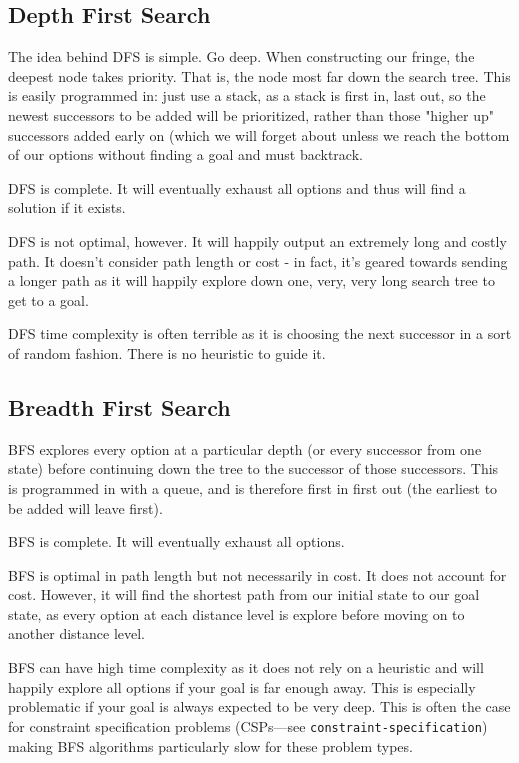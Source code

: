\documentclass[12pt]{article}
\begin{document}
\subsection*{Depth First Search}

The idea behind DFS is simple. Go deep. When constructing our fringe, the deepest node takes priority. That is, the node most far down the search tree. This is easily programmed in: just use a stack, as a stack is first in, last out, so the newest successors to be added will be prioritized, rather than those "higher up" successors added early on (which we will forget about unless we reach the bottom of our options without finding a goal and must backtrack.

DFS is complete. It will eventually exhaust all options and thus will find a solution if it exists.

DFS is not optimal, however. It will happily output an extremely long and costly path. It doesn't consider path length or cost - in fact, it's geared towards sending a longer path as it will happily explore down one, very, very long search tree to get to a goal.

DFS time complexity is often terrible as it is choosing the next successor in a sort of random fashion. There is no heuristic to guide it.

\subsection*{Breadth First Search}

BFS explores every option at a particular depth (or every successor from one state) before continuing down the tree to the successor of those successors. This is programmed in with a queue, and is therefore first in first out (the earliest to be added will leave first).

BFS is complete. It will eventually exhaust all options.

BFS is optimal in path length but not necessarily in cost. It does not account for cost. However, it will find the shortest path from our initial state to our goal state, as every option at each distance level is explore before moving on to another distance level.

BFS can have high time complexity as it does not rely on a heuristic and will happily explore all options if your goal is far enough away. This is especially problematic if your goal is always expected to be very deep. This is often the case for constraint specification problems (CSPs—see \texttt{constraint-specification}) making BFS algorithms particularly slow for these problem types.
\end{document}
